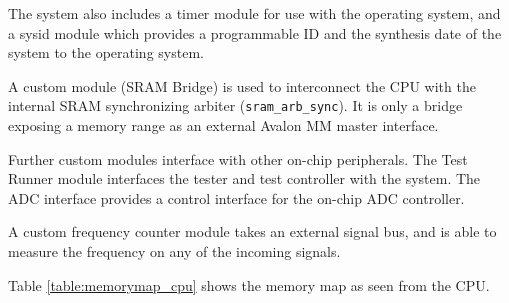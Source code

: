 The system also includes a timer module for use with the operating system, and a sysid module
which provides a programmable ID and the synthesis date of the system to the operating system.

A custom module (SRAM Bridge) is used to interconnect the CPU with the internal SRAM synchronizing
arbiter (\texttt{sram\_arb\_sync}). It is only a bridge exposing a memory range as an external
Avalon MM master interface.

Further custom modules interface with other on-chip peripherals. The Test Runner module
interfaces the tester and test controller with the system. The ADC interface provides a control
interface for the on-chip ADC controller.

A custom frequency counter module takes an external signal bus, and is able to measure the frequency
on any of the incoming signals.

Table \ref{table:memorymap_cpu} shows the memory map as seen from the CPU.

